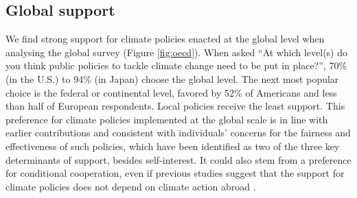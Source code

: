 

\subsection{Global support}\label{subsubsec:global_support}

We find strong support for climate policies enacted at the global level when analysing the global survey (Figure \ref{fig:oecd}). %
When asked ``At which level(s) do you think public policies to tackle climate change need to be put in place?'', 70\% (in the U.S.) to 94\% (in Japan) choose the global level. The next most popular choice is the federal or continental level, favored by 52\% of Americans and less than half of European respondents. Local policies receive the least support. This preference for climate policies implemented at the global scale is in line with earlier contributions \cite{beiser-mcgrath_could_2019,bechtel_mass_2013,sivonen_attitudes_2022} %
and consistent with individuals' concerns for the fairness and effectiveness of such policies, which have been identified as two of the three key determinants of support, besides self-interest.\citep{klenert_making_2018,douenne_yellow_2022,dechezlepretre_fighting_nodate} It could also stem from a preference for conditional cooperation,\citep{barrett_self-enforcing_1994} even if previous studies suggest that the support for climate policies does not depend on climate action abroad \citep{aklin_prisoners_2020,tingley_conditional_2014}. %



